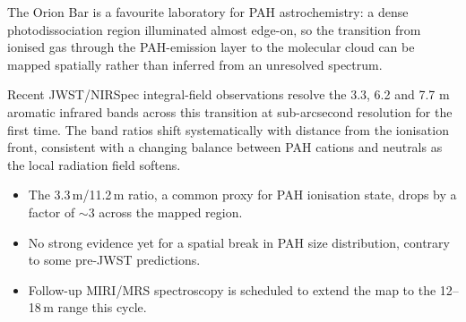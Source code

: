 \documentclass{astropah}
\begin{document}
\begin{infocus}

  \begin{center}
    {\infocustitle \noindent {}}
  \end{center}
  \vspace{0.4cm}
  \normalsize

  The Orion Bar is a favourite laboratory for PAH astrochemistry: a dense
  photodissociation region illuminated almost edge-on, so the transition
  from ionised gas through the PAH-emission layer to the molecular cloud
  can be mapped spatially rather than inferred from an unresolved spectrum.

  Recent JWST/NIRSpec integral-field observations resolve the 3.3, 6.2 and
  7.7 \textmu m aromatic infrared bands across this transition at
  sub-arcsecond resolution for the first time. The band ratios shift
  systematically with distance from the ionisation front, consistent with a
  changing balance between PAH cations and neutrals as the local radiation
  field softens.

  \begin{itemize}
    \item The 3.3\,\textmu m/11.2\,\textmu m ratio, a common proxy for PAH
      ionisation state, drops by a factor of $\sim$3 across the mapped
      region.
    \item No strong evidence yet for a spatial break in PAH size
      distribution, contrary to some pre-JWST predictions.
    \item Follow-up MIRI/MRS spectroscopy is scheduled to extend the map to
      the 12--18\,\textmu m range this cycle.
  \end{itemize}

\end{infocus}
\end{document}
